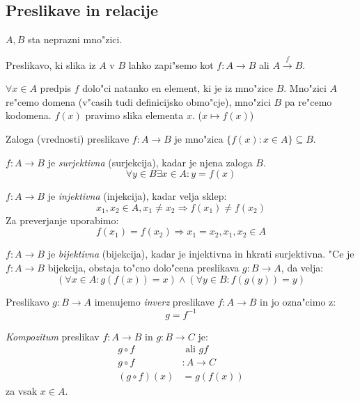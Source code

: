 \subsection{Preslikave in relacije}
$A, B$ sta neprazni mno"zici.

Preslikavo, ki slika iz $A$ v $B$ lahko zapi"semo kot $f: A \rightarrow B$ ali $A \stackrel{f}{\rightarrow} B$.

$\forall x \in A$ predpis $f$ dolo"ci natanko en element, ki je iz mno"zice $B$. Mno"zici $A$ re"cemo domena (v"casih tudi definicijsko obmo"cje), mno"zici $B$ pa re"cemo kodomena. $f(x)$ pravimo slika elementa $x$. ($x \mapsto f(x)$)

Zaloga (vrednosti) preslikave $f: A \rightarrow B$ je mno"zica $\{f(x): x \in A\} \subseteq B$.

$f: A \rightarrow B$ je \emph{surjektivna} (surjekcija), kadar je njena zaloga $B$.
\begin{equation*}
\forall y \in B \exists x \in A: y = f(x)
\end{equation*}

$f: A \rightarrow B$ je \emph{injektivna} (injekcija), kadar velja sklep:
\begin{equation*}
x_1, x_2 \in A, x_1 \neq x_2 \Rightarrow f(x_1) \neq f(x_2)
\end{equation*}
Za preverjanje uporabimo:
\begin{equation*}
f(x_1) = f(x_2) \Rightarrow x_1 = x_2, x_1, x_2 \in A
\end{equation*}

$f: A \rightarrow B$ je \emph{bijektivna} (bijekcija), kadar je injektivna in hkrati surjektivna. "Ce je $f: A \rightarrow B$ bijekcija, obstaja to"cno dolo"cena preslikava $g: B \rightarrow A$, da velja:
\begin{equation*}
(\forall x \in A: g(f(x)) = x) \land (\forall y \in B: f(g(y)) = y)
\end{equation*}

Preslikavo $g: B \rightarrow A$ imenujemo \emph{inverz} preslikave $f: A \rightarrow B$ in jo ozna"cimo z:
\begin{equation*}
g = f^{-1}
\end{equation*}

\emph{Kompozitum} preslikav $f: A \rightarrow B$ in $g: B \rightarrow C$ je:
\begin{align*}
g \circ f &\text{ ali } gf\\
g \circ f &: A \rightarrow C\\
(g \circ f)(x) &= g(f(x))
\end{align*}
za vsak $x \in A$.
